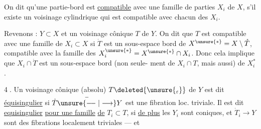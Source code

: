 On dit qu'une partie-bord  est \uline{compatible} avec
une famille de parties $X_i$ de $X$, s'il
existe un voisinage cylindrique qui est
compatible  avec chacun des $X_i$.

Revenons : $Y\subset X$ et un voisinage
cônique  $T$ de $Y$. On dit que $T$ est
 compatible avec une famille de $X_i\subset X$
si 
$\dot T$ est un sous-espace bord de
$X^{\unsure{*}}=X\setminus\mathring T$, compatible avec la famille des
$X_i^{\unsure{*}}=X^{\unsure{*}}\cap X_i$. Donc cela implique que
$X_i\cap\dot T$ est un sous-espace bord (non seule-
ment de $X_i\cap T$, mais aussi) de $X_i^*$.

\textcircled{4}.  Un voisinage cônique (absolu)
$T\deleted{\unsure{_\varepsilon}}$ de
$Y$ est dit \uline{équisingulier} si $\dot T\overset{-}{\unsure{\relbar\joinrel\relbar|\longrightarrow}}Y$ est une
fibration loc. triviale. Il est dit \uline{equisingulier}
\uline{pour une famille} \uline{de} $T_i\subset T$, si \uline{de plus}
les $Y_i$ sont coniques, et $\dot T_i\longrightarrow Y$ sont des
fibrations localement triviales --- et 
